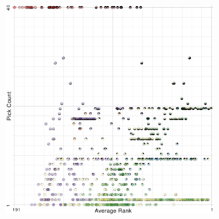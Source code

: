 

\begin{figure}[ht]
\centering
\begin{subfigure}{0.24\linewidth}
\includegraphics[width=\linewidth]{infuse/ap}
\label{subfig:ap}
\end{subfigure}%
~%
\begin{subfigure}{0.24\linewidth}

\end{subfigure}
\end{figure}
